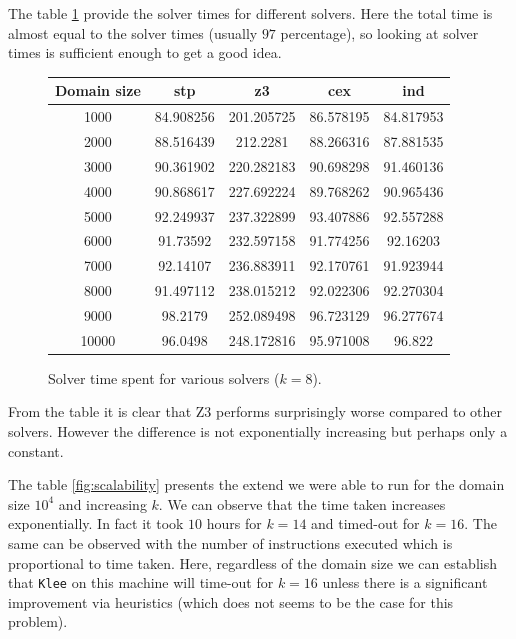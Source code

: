 \documentclass[11pt,a4paper,notitlepage]{article}
\begin{document}
The table \ref{fig:solvertime} provide the solver times for different solvers.
Here the total time is almost equal to the solver times (usually $97$ percentage),
so looking at solver times is sufficient enough to get a good idea.

\begin{figure}
\centering
\begin{tabular}{|c|c|c|c|c|}
\hline
\textbf{Domain size} & stp & z3 & cex & ind \\ \hline \hline
1000 & 84.908256 & 201.205725 & 86.578195 & 84.817953 \\
2000 & 88.516439 & 212.2281 & 88.266316 & 87.881535 \\
3000 & 90.361902 & 220.282183 & 90.698298 & 91.460136 \\
4000 & 90.868617 & 227.692224 & 89.768262 & 90.965436 \\
5000 & 92.249937 & 237.322899 & 93.407886 & 92.557288 \\
6000 & 91.73592 & 232.597158 & 91.774256 & 92.16203 \\
7000 & 92.14107 & 236.883911 & 92.170761 & 91.923944 \\
8000 & 91.497112 & 238.015212 & 92.022306 & 92.270304 \\
9000 & 98.2179 & 252.089498 & 96.723129 & 96.277674 \\
10000 & 96.0498 & 248.172816 & 95.971008 & 96.822 \\
\hline
\end{tabular}
\caption{Solver time spent for various solvers ($k = 8$).}
\label{fig:solvertime}
\end{figure}


From the table it is clear that Z3 performs surprisingly worse compared to other solvers.
However the difference is not exponentially increasing but perhaps only a constant.

The table \ref{fig:scalability} presents the extend we were able to run for the domain size $10^4$ and increasing $k$.
We can observe that the time taken increases exponentially. In fact it took $10$ hours for $k = 14$ and timed-out for $k=16$.
The same can be observed with the number of instructions executed which is proportional to time taken.
Here, regardless of the domain size we can establish that \texttt{Klee} on this machine will time-out for $k=16$ unless there is a significant improvement via heuristics (which does not seems to be the case for this problem).
\end{document}
